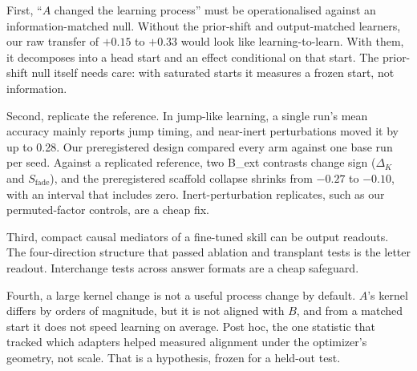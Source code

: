 \documentclass[11pt]{article}
\begin{document}
First, ``$A$ changed the learning process'' must be operationalised against an information-matched null. Without the prior-shift and output-matched learners, our raw transfer of $+0.15$ to $+0.33$ would look like learning-to-learn. With them, it decomposes into a head start and an effect conditional on that start. The prior-shift null itself needs care: with saturated starts it measures a frozen start, not information.

Second, replicate the reference. In jump-like learning, a single run's mean accuracy mainly reports jump timing, and near-inert perturbations moved it by up to 0.28. Our preregistered design compared every arm against one base run per seed. Against a replicated reference, two B\_ext contrasts change sign ($\Delta_K$ and $S_{\text{fade}}$), and the preregistered scaffold collapse shrinks from $-0.27$ to $-0.10$, with an interval that includes zero. Inert-perturbation replicates, such as our permuted-factor controls, are a cheap fix.

Third, compact causal mediators of a fine-tuned skill can be output readouts. The four-direction structure that passed ablation and transplant tests is the letter readout. Interchange tests across answer formats are a cheap safeguard.

Fourth, a large kernel change is not a useful process change by default. $A$'s kernel differs by orders of magnitude, but it is not aligned with $B$, and from a matched start it does not speed learning on average. Post hoc, the one statistic that tracked which adapters helped measured alignment under the optimizer's geometry, not scale. That is a hypothesis, frozen for a held-out test.
\end{document}
